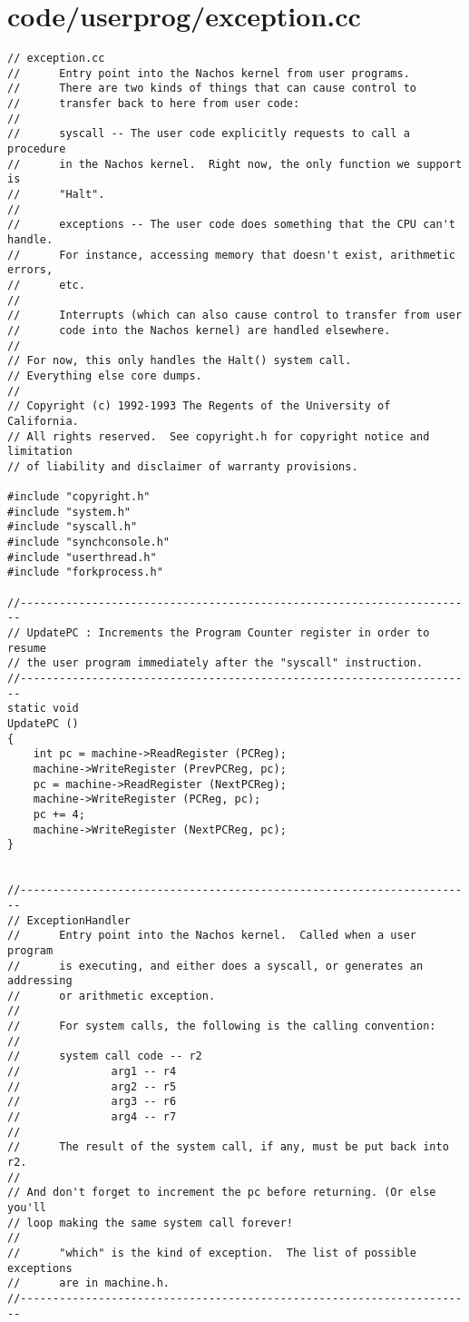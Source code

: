 \documentclass[a4paper,10pt]{article}
\begin{document}
\section{code/userprog/exception.cc}
\begin{lstlisting}
// exception.cc
//      Entry point into the Nachos kernel from user programs.
//      There are two kinds of things that can cause control to
//      transfer back to here from user code:
//
//      syscall -- The user code explicitly requests to call a procedure
//      in the Nachos kernel.  Right now, the only function we support is
//      "Halt".
//
//      exceptions -- The user code does something that the CPU can't handle.
//      For instance, accessing memory that doesn't exist, arithmetic errors,
//      etc.
//
//      Interrupts (which can also cause control to transfer from user
//      code into the Nachos kernel) are handled elsewhere.
//
// For now, this only handles the Halt() system call.
// Everything else core dumps.
//
// Copyright (c) 1992-1993 The Regents of the University of California.
// All rights reserved.  See copyright.h for copyright notice and limitation
// of liability and disclaimer of warranty provisions.

#include "copyright.h"
#include "system.h"
#include "syscall.h"
#include "synchconsole.h"
#include "userthread.h"
#include "forkprocess.h"

//----------------------------------------------------------------------
// UpdatePC : Increments the Program Counter register in order to resume
// the user program immediately after the "syscall" instruction.
//----------------------------------------------------------------------
static void
UpdatePC ()
{
    int pc = machine->ReadRegister (PCReg);
    machine->WriteRegister (PrevPCReg, pc);
    pc = machine->ReadRegister (NextPCReg);
    machine->WriteRegister (PCReg, pc);
    pc += 4;
    machine->WriteRegister (NextPCReg, pc);
}


//----------------------------------------------------------------------
// ExceptionHandler
//      Entry point into the Nachos kernel.  Called when a user program
//      is executing, and either does a syscall, or generates an addressing
//      or arithmetic exception.
//
//      For system calls, the following is the calling convention:
//
//      system call code -- r2
//              arg1 -- r4
//              arg2 -- r5
//              arg3 -- r6
//              arg4 -- r7
//
//      The result of the system call, if any, must be put back into r2.
//
// And don't forget to increment the pc before returning. (Or else you'll
// loop making the same system call forever!
//
//      "which" is the kind of exception.  The list of possible exceptions
//      are in machine.h.
//----------------------------------------------------------------------



\end{lstlisting}
\end{document}
